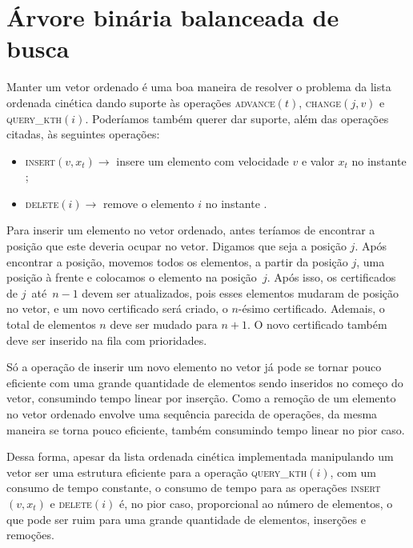 

\section{Árvore binária balanceada de busca} \label{sec:abb}

Manter um vetor ordenado é uma boa maneira de resolver o problema da
lista ordenada cinética dando suporte às operações
\textsc{advance}$(t)$, \textsc{change}$(j,v)$ e
\textsc{query\_kth}$(i)$.
Poderíamos também querer dar suporte, além das operações citadas, às seguintes operações:

\begin{itemize}
    \item \textsc{insert}$(v, x_t) \rightarrow$ insere um
    elemento com velocidade $v$ e valor $x_t$ no instante \now;
    \item \textsc{delete}$(i) \rightarrow$ remove o elemento
    $i$ no instante \now.
\end{itemize}

Para inserir um elemento no vetor ordenado, antes teríamos de
encontrar a posição que este deveria ocupar no vetor.
Digamos que seja a posição $j$.
Após encontrar a posição, movemos todos os elementos, a partir da posição $j$, uma posição à
frente e colocamos o elemento na posição~$j$.
Após isso, os certificados de $j$~até~$n-1$ devem ser atualizados, pois esses elementos mudaram de
posição no vetor, e um novo certificado será criado, o $n$-ésimo
certificado.
Ademais, o total de elementos $n$ deve ser mudado para $n + 1$.
O novo certificado também deve ser inserido na fila com prioridades.

Só a operação de inserir um novo elemento no vetor já pode se tornar
pouco eficiente com uma grande quantidade de elementos sendo
inseridos no começo do vetor, consumindo tempo linear por inserção.
Como a remoção de um elemento no vetor ordenado envolve uma
sequência parecida de operações, da mesma maneira se torna pouco
eficiente, também consumindo tempo linear no pior caso.

Dessa forma, apesar da lista ordenada cinética implementada
manipulando um vetor ser uma estrutura eficiente para a operação
\textsc{query\_kth}$(i)$, com um consumo de tempo constante, o
consumo de tempo para as operações \textsc{insert}$(v, x_t)$ e
\textsc{delete}$(i)$ é, no pior caso, proporcional ao número de
elementos, o que pode ser ruim para uma grande quantidade de
elementos, inserções e remoções.


